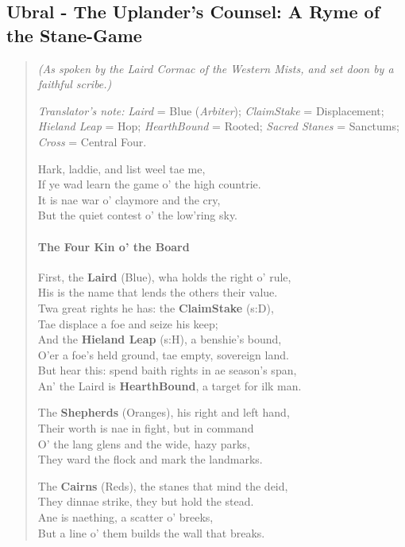 \documentclass[11pt]{article}
\begin{document}
\subsection{Ubral - The Uplander’s Counsel: A Ryme of the Stane-Game}
\begin{quote}\small\itshape
\textit{(As spoken by the Laird Cormac of the Western Mists, and set doon by a faithful scribe.)}

\medskip
\textit{Translator’s note:} \emph{Laird} = Blue (\emph{Arbiter}); \emph{Claim\textendash Stake} = Displacement; \emph{Hieland Leap} = Hop; \emph{Hearth\textendash Bound} = Rooted; \emph{Sacred Stanes} = Sanctums; \emph{Cross} = Central Four.

\medskip
Hark, laddie, and list weel tae me,\\
If ye wad learn the game o' the high countrie.\\
It is nae war o' claymore and the cry,\\
But the quiet contest o' the low'ring sky.

\paragraph{The Four Kin o' the Board}
First, the \textbf{Laird} (Blue), wha holds the right o' rule,\\
His is the name that lends the others their value.\\
Twa great rights he has: the \textbf{Claim\textendash Stake} (s{:}D),\\
Tae displace a foe and seize his keep;\\
And the \textbf{Hieland Leap} (s{:}H), a benshie's bound,\\
O'er a foe's held ground, tae empty, sovereign land.\\
But hear this: spend baith rights in ae season's span,\\
An' the Laird is \textbf{Hearth\textendash Bound}, a target for ilk man.

The \textbf{Shepherds} (Oranges), his right and left hand,\\
Their worth is nae in fight, but in command\\
O' the lang glens and the wide, hazy parks,\\
They ward the flock and mark the landmarks.

The \textbf{Cairns} (Reds), the stanes that mind the deid,\\
They dinnae strike, they but hold the stead.\\
Ane is naething, a scatter o' breeks,\\
But a line o' them builds the wall that breaks.


\end{quote}
\end{document}
